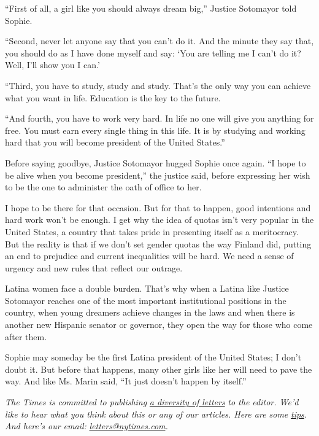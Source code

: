 ``First of all, a girl like you should always dream big,'' Justice
Sotomayor told Sophie.

``Second, never let anyone say that you can't do it. And the minute they
say that, you should do as I have done myself and say: `You are telling
me I can't do it? Well, I'll show you I can.'

``Third, you have to study, study and study. That's the only way you can
achieve what you want in life. Education is the key to the future.

``And fourth, you have to work very hard. In life no one will give you
anything for free. You must earn every single thing in this life. It is
by studying and working hard that you will become president of the
United States.''

Before saying goodbye, Justice Sotomayor hugged Sophie once again. ``I
hope to be alive when you become president,'' the justice said, before
expressing her wish to be the one to administer the oath of office to
her.

I hope to be there for that occasion. But for that to happen, good
intentions and hard work won't be enough. I get why the idea of quotas
isn't very popular in the United States, a country that takes pride in
presenting itself as a meritocracy. But the reality is that if we don't
set gender quotas the way Finland did, putting an end to prejudice and
current inequalities will be hard. We need a sense of urgency and new
rules that reflect our outrage.

Latina women face a double burden. That's why when a Latina like Justice
Sotomayor reaches one of the most important institutional positions in
the country, when young dreamers achieve changes in the laws and when
there is another new Hispanic senator or governor, they open the way for
those who come after them.

Sophie may someday be the first Latina president of the United States; I
don't doubt it. But before that happens, many other girls like her will
need to pave the way. And like Ms. Marin said, ``It just doesn't happen
by itself.''

\emph{The Times is committed to publishing}
\href{https://www.nytimes.com/2019/01/31/opinion/letters/letters-to-editor-new-york-times-women.html}{\emph{a
diversity of letters}} \emph{to the editor. We'd like to hear what you
think about this or any of our articles. Here are some}
\href{https://help.nytimes.com/hc/en-us/articles/115014925288-How-to-submit-a-letter-to-the-editor}{\emph{tips}}\emph{.
And here's our email:}
\href{mailto:letters@nytimes.com}{\emph{letters@nytimes.com}}\emph{.}

